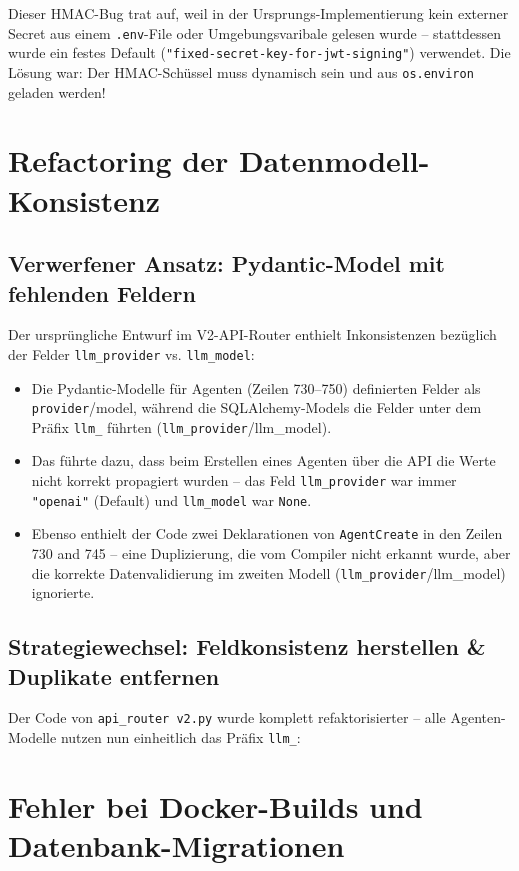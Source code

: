 \documentclass[12pt,a4paper,titlepage,abstract]{scrreprt}
\begin{document}
\begin{compactitem}
{Dieser HMAC-Bug trat auf, weil in der Ursprungs-Implementierung kein externer Secret aus einem \texttt{.env}-File oder Umgebungsvaribale gelesen wurde -- stattdessen wurde ein festes Default (\texttt{"fixed-secret-key-for-jwt-signing"}) verwendet. Die Lösung war: Der HMAC-Schüssel muss dynamisch sein und aus \texttt{os.environ} geladen werden!


\chapter{Refactoring der Datenmodell-Konsistenz}\label{sec:data-model-fixes}

\section*{Verwerfener Ansatz: Pydantic-Model mit fehlenden Feldern}
Der ursprüngliche Entwurf im V2-API-Router enthielt Inkonsistenzen bezüglich der Felder \texttt{llm\_provider} vs. \texttt{llm\_model}:

\begin{itemize}
  \item Die Pydantic-Modelle für Agenten (Zeilen 730--750) definierten Felder als \texttt{provider}/{model}, während die SQLAlchemy-Models die Felder unter dem Präfix \texttt{llm\_} führten (\texttt{llm\_provider}/{llm\_model}). 
  \item Das führte dazu, dass beim Erstellen eines Agenten über die API die Werte nicht korrekt propagiert wurden -- das Feld \texttt{llm\_provider} war immer \texttt{"openai"} (Default) und \texttt{llm\_model} war \texttt{None}.
  \item Ebenso enthielt der Code zwei Deklarationen von \texttt{AgentCreate} in den Zeilen 730 and 745 -- eine Duplizierung, die vom Compiler nicht erkannt wurde, aber die korrekte Datenvalidierung im zweiten Modell (\texttt{llm\_provider}/{llm\_model}) ignorierte.
\end{itemize}

\section*{Strategiewechsel: Feldkonsistenz herstellen \& Duplikate entfernen}

Der Code von \texttt{api\_router v2.py} wurde komplett refaktorisierter -- alle Agenten-Modelle nutzen nun einheitlich das Präfix \texttt{llm\_}:


\chapter{Fehler bei Docker-Builds und Datenbank-Migrationen}

}
\end{compactitem}
\end{document}
